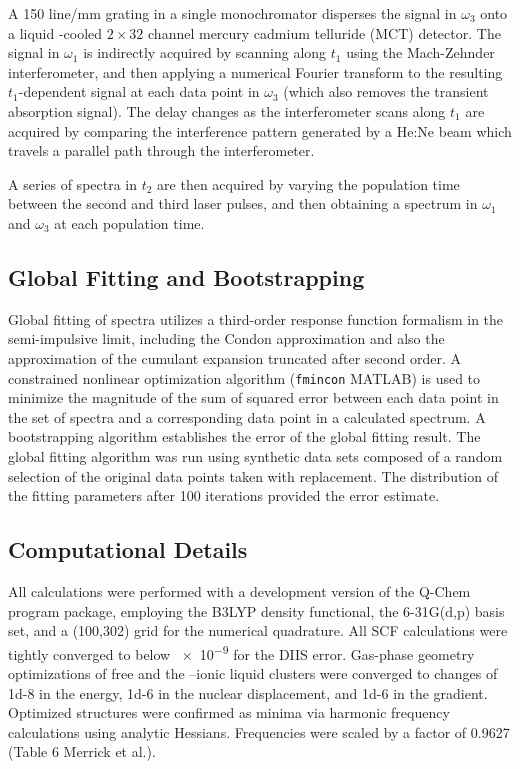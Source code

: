 \documentclass[%
  class = book,%
  crop = false,%
  float = true,%
  multi = true,%
  preview = false,%
]{standalone}
\begin{document}
{A 150 line/mm grating in a single monochromator disperses the signal in \(\omega_3\) onto a liquid -cooled \(2 \times 32\) channel mercury cadmium telluride (MCT) detector. The signal in \(\omega_1\) is indirectly acquired by scanning along \(t_1\) using the Mach-Zehnder interferometer, and then applying a numerical Fourier transform to the resulting \(t_1\)-dependent signal at each data point in \(\omega_3\) (which also removes the transient absorption signal). The delay changes as the interferometer scans along \(t_1\) are acquired by comparing the interference pattern generated by a He:Ne beam which travels a parallel path through the interferometer.

A series of spectra in \(t_2\) are then acquired by varying the population time between the second and third laser pulses, and then obtaining a spectrum in \(\omega_1\) and \(\omega_3\) at each population time.

\subsection{Global Fitting and Bootstrapping}
\label{sec:anions_methods_fitting}

Global fitting of spectra utilizes a third-order response function formalism in the semi-impulsive limit, including the Condon approximation and also the approximation of the cumulant expansion truncated after second order. A constrained nonlinear optimization algorithm (\verb!fmincon! MATLAB) is used to minimize the magnitude of the sum of squared error between each data point in the set of spectra and a corresponding data point in a calculated spectrum. A bootstrapping algorithm \cite{numericalrecipes-92} establishes the error of the global fitting result. The global fitting algorithm was run using synthetic data sets composed of a random selection of the original data points taken with replacement. The distribution of the fitting parameters after 100 iterations provided the error estimate.

\subsection{Computational Details}
\label{sec:anions_methods_computational}

All calculations were performed with a development version of the Q-Chem program package\cite{Shao2015}, employing the B3LYP density functional\cite{Becke1993,Stephens1994}, the 6-31G(d,p) basis set\cite{Hehre1972,Francl1982}, and a (100,302) grid for the numerical quadrature. All SCF calculations were tightly converged to below \SI{e-9}{\au} for the DIIS error\cite{25}. Gas-phase geometry optimizations of free  and the --ionic liquid clusters were converged to changes of \SI{1d-8}{\au} in the energy, \SI{1d-6}{\au} in the nuclear displacement, and \SI{1d-6}{\au} in the gradient. Optimized structures were confirmed as minima via harmonic frequency calculations using analytic Hessians. Frequencies were scaled by a factor of \num{0.9627} (Table 6 Merrick et al.)\cite{Merrick2007}.

}
\end{document}
